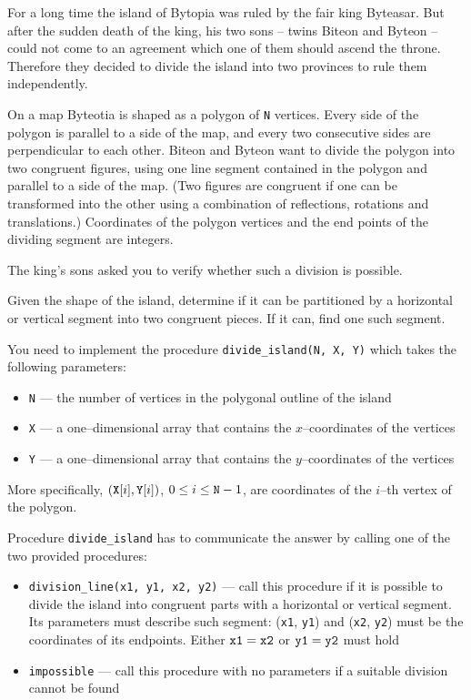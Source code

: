 \documentclass{../../../latex/boi2014}
\newcommand{\param}[1]{{\tt #1}}
\newcommand{\method}[1]{{\tt #1}}
\newcommand{\N}{\param{N}}
\newcommand{\X}{\param{X}}
\newcommand{\Y}{\param{Y}}
\newcommand{\xa}{\param{x1}}
\newcommand{\ya}{\param{y1}}
\newcommand{\xb}{\param{x2}}
\newcommand{\yb}{\param{y2}}
\begin{document}
    For a long time the island of Bytopia was ruled by the fair king
    Byteasar. But after the sudden death
    of the king, his two sons -- twins Biteon and Byteon -- could
    not come to an agreement which one of them should ascend the throne.
    Therefore they decided to divide the island into two provinces to
    rule them independently.  
 
    On a map Byteotia is shaped as a polygon of \N{} vertices. Every
    side of the polygon is parallel to a side of the map, and every
    two consecutive sides are perpendicular to each other.  Biteon
    and Byteon want to divide the polygon into two congruent figures,
    using one line segment contained in the polygon and parallel to a
    side of the map.  (Two figures are congruent if one can be transformed
    into the other using a combination of reflections, rotations and
    translations.) Coordinates of the polygon vertices and the end points
    of the dividing segment are integers.  
 
    The king's sons asked you to verify whether such a division is
    possible.

    \Task

    Given the shape of the island, determine if it can be partitioned
    by a horizontal or vertical segment into two congruent pieces. If
    it can, find one such segment.

    \Implementation
    You need to implement the procedure \method{divide\_island(N, X, Y)}
    which takes the following parameters:
    \begin{itemize}
        \item \N{} --- the number of vertices in the polygonal outline of
            the island
        \item \X{} --- a one--dimensional array that contains the
            $x$--coordinates of the vertices
        \item \Y{} --- a one--dimensional array that contains the
            $y$--coordinates of the vertices
    \end{itemize}

    More specifically, $(\X[i], \Y[i])$, $0 \le i \le \N-1$, are
    coordinates of the $i$--th vertex of the polygon.

    Procedure \method{divide\_island} has to communicate the answer
    by calling one of the two provided procedures:
    \begin{itemize}
        \item \method{division\_line(\xa, \ya, \xb, \yb)} --- call
            this procedure if it is possible to divide the island
            into congruent parts with a horizontal or vertical segment.
            Its parameters must describe such segment: 
            (\xa, \ya) and (\xb, \yb) must be the coordinates of its
            endpoints. Either $\xa = \xb$ or $\ya = \yb$ must hold
        \item \method{impossible} --- call this procedure with no
            parameters if a suitable division cannot be found
    \end{itemize}
\end{document}
